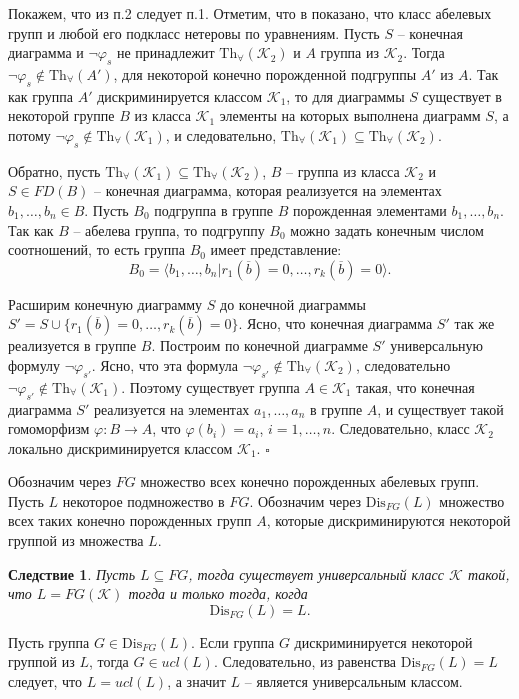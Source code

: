 \documentclass[a4paper,11pt,twoside]{article}
\newtheorem{corollary}{Следствие}[section]
\def\proof{{\noindent{\bf Доказательство.}} }
\def\K{{\mathcal{K}}}
\def\Tha{{\mathrm{Th}_\forall}}
\def\Dis{{\mathrm{Dis}}}
\begin{document}
\proof Покажем, что из п.2 следует п.1. Отметим, что в \cite{DMR2} показано, что класс абелевых групп и любой его подкласс нетеровы по уравнениям. Пусть $S$ -- конечная диаграмма и $\neg \varphi_s$ не принадлежит $\Tha(\K_2)$ и $A$ группа из $\K_2$. Тогда $\neg \varphi_s \notin \Tha(A')$, для некоторой конечно порожденной подгруппы $A'$ из $A$. Так как группа $A'$ дискриминируется классом $\K_1$, то для диаграммы $S$ существует в некоторой группе $B$ из класса $\K_1$ элементы на которых выполнена диаграмм $S$, а потому $\neg \varphi_s \notin \Tha(\K_1)$, и следовательно, $\Tha(\K_1) \subseteq \Tha(\K_2)$.

Обратно, пусть $\Tha(\K_1) \subseteq \Tha(\K_2)$, $B$ -- группа из класса $\K_2$ и $S \in FD(B)$ -- конечная диаграмма, которая реализуется на элементах $b_1, \ldots, b_n \in B$. Пусть $B_0$ подгруппа в группе $B$ порожденная элементами $b_1, \ldots, b_n$. Так как $B$ -- абелева группа, то подгруппу $B_0$ можно задать конечным числом соотношений, то есть группа $B_0$ имеет представление:
 $$B_0 = \langle b_1, \ldots, b_n | r_1(\overline{b}) = 0, \ldots, r_k(\overline{b}) = 0 \rangle.$$

Расширим конечную диаграмму $S$ до конечной диаграммы $S' = S \cup \{r_1(\overline{b}) = 0, \ldots, r_k(\overline{b}) = 0\}$. Ясно, что конечная диаграмма $S'$ так же реализуется в группе $B$. Построим по конечной диаграмме $S'$ универсальную формулу $\neg\varphi_{s'}$. Ясно, что эта формула $\neg\varphi_{s'} \notin \Tha(\K_2)$, следовательно $\neg\varphi_{s'} \notin \Tha(\K_1)$. Поэтому существует группа $A \in \K_1$ такая, что конечная диаграмма $S'$ реализуется на элементах $a_1, \ldots, a_n$ в группе $A$, и существует такой гомоморфизм $\varphi: B \rightarrow A$, что $\varphi(b_i) = a_i$, $i = 1, \ldots, n$. Следовательно, класс $\K_2$ локально дискриминируется классом $\K_1$. $\square$


Обозначим через $FG$ множество всех конечно порожденных абелевых групп. Пусть $L$ некоторое подмножество в $FG$. Обозначим через $\Dis_{FG}(L)$ множество всех таких конечно порожденных групп $A$, которые дискриминируются некоторой группой из множества $L$.

\begin{corollary}\label{cor:LisFGbyK}
Пусть $L \subseteq FG$, тогда существует универсальный класс $\K$ такой, что $L = FG(\K)$ тогда и только тогда, когда
$$\Dis_{FG}(L) = L.$$
\end{corollary}

\proof Пусть группа $G \in \Dis_{FG}(L)$. Если группа $G$ дискриминируется некоторой группой из $L$, тогда $G \in ucl(L)$. Следовательно, из равенства $\Dis_{FG}(L) = L$ следует, что $L = ucl(L)$, а значит $L$ -- является универсальным классом.
\end{document}
